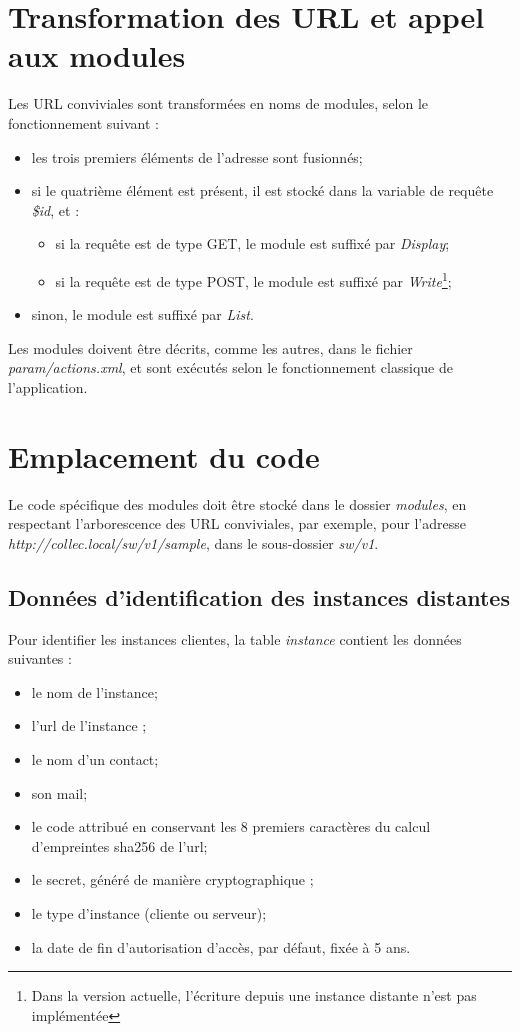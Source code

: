 \section{Transformation des URL et appel aux modules}
Les URL conviviales sont transformées en noms de modules, selon le fonctionnement suivant :
\begin{itemize}
\item les trois premiers éléments de l'adresse sont fusionnés;
\item si le quatrième élément est présent, il est stocké dans la variable de requête \textit{\$id}, et :
\begin{itemize}
\item si la requête est de type GET, le module est suffixé par \textit{Display};
\item si la requête est de type POST, le module est suffixé par \textit{Write}\footnote{Dans la version actuelle, l'écriture depuis une instance distante n'est pas implémentée};
\end{itemize}
\item sinon, le module est suffixé par \textit{List}.
\end{itemize}

Les modules doivent être décrits, comme les autres, dans le fichier \textit{param/actions.xml}, et sont exécutés selon le fonctionnement classique de l'application.

\section{Emplacement du code}
Le code spécifique des modules doit être stocké dans le dossier \textit{modules}, en respectant l'arborescence des URL conviviales, par exemple, pour l'adresse \textit{http://collec.local/sw/v1/sample}, dans le sous-dossier \textit{sw/v1}.


\subsection{Données d'identification des instances distantes}
\label{table_instance}

Pour identifier les instances clientes, la table \textit{instance} contient les données suivantes :
\begin{itemize}
\item le nom de l'instance;
\item l'url de l'instance ;
\item le nom d'un contact;
\item son mail;
\item le code attribué en conservant les 8 premiers caractères du calcul d'empreintes sha256 de l'url;
\item le secret, généré de manière cryptographique ;
\item le type d'instance (cliente ou serveur);
\item la date de fin d'autorisation d'accès, par défaut, fixée à 5 ans.
\end{itemize}


